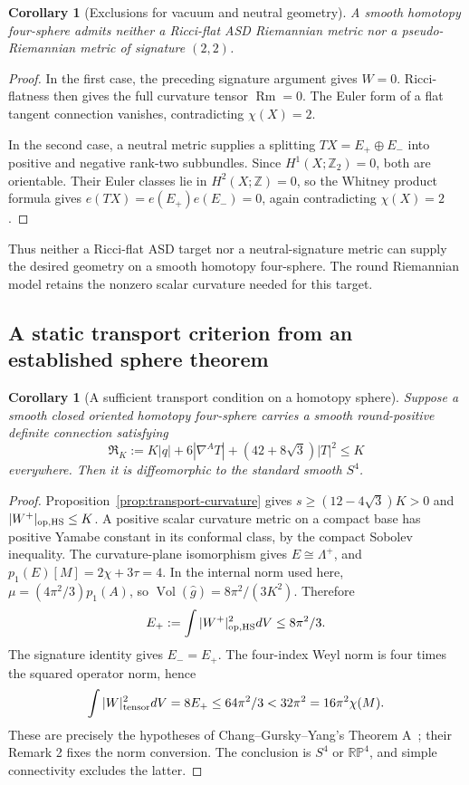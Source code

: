 \documentclass[11pt]{article}
\numberwithin{equation}{section}
\newtheorem{corollary}[theorem]{Corollary}
\theoremstyle{definition}
\theoremstyle{remark}
\DeclareMathOperator{\Vol}{Vol}
\begin{document}
\begin{corollary}[Exclusions for vacuum and neutral geometry]
\label{cor:ctx-wave-exclusions}
A smooth homotopy four-sphere admits neither a Ricci-flat ASD
Riemannian metric nor a pseudo-Riemannian metric of signature $(2,2)$.
\end{corollary}
\begin{proof}
In the first case, the preceding signature argument gives $W=0$.
Ricci-flatness then gives the full curvature tensor
$\operatorname{Rm}=0$.  The Euler form of a flat tangent connection
vanishes, contradicting $\chi(X)=2$.

In the second case, a neutral metric supplies a splitting
$TX=E_+\oplus E_-$ into positive and negative rank-two subbundles.
Since $H^1(X;\mathbb Z_2)=0$, both are orientable.  Their Euler
classes lie in $H^2(X;\mathbb Z)=0$, so the Whitney product formula
gives $e(TX)=e(E_+)e(E_-)=0$, again contradicting $\chi(X)=2$.
\end{proof}

Thus neither a Ricci-flat ASD target nor a neutral-signature metric can supply the desired geometry on a smooth homotopy four-sphere. The round Riemannian model retains the nonzero scalar curvature needed for this target.




\subsection{A static transport criterion from an established sphere theorem}
\label{subsec:static-sphere}

\begin{corollary}[A sufficient transport condition on a homotopy sphere]
\label{cor:static-transport-sphere}
Suppose a smooth closed oriented homotopy four-sphere carries a smooth
round-positive definite connection satisfying
\[
 \mathfrak R_K:=K|q|+6|\nabla^A T|+(42+8\sqrt3)|T|^2\leq K
\]
everywhere. Then it is diffeomorphic to the standard smooth $S^4$.
\end{corollary}
\begin{proof}
Proposition~\ref{prop:transport-curvature} gives
$s\geq(12-4\sqrt3)K>0$ and $|W^+|_{\rm op,HS}\leq K$.
A positive scalar curvature metric on a compact base has positive Yamabe
constant in its conformal class, by the compact Sobolev inequality.
The curvature-plane isomorphism gives $E\cong\Lambda^+$, and
$p_1(E)[M]=2\chi+3\tau=4$. In the internal norm used here,
$\mu=(4\pi^2/3)p_1(A)$, so
$\Vol(\widehat g)=8\pi^2/(3K^2)$. Therefore
\[
 E_+:=\int|W^+|_{\rm op,HS}^2dV\leq8\pi^2/3.
\]
The signature identity gives $E_-=E_+$. The four-index Weyl norm is
four times the squared operator norm, hence
\[
 \int|W|_{\rm tensor}^2dV=8E_+
       \leq64\pi^2/3<32\pi^2=16\pi^2\chi(M).
\]
These are precisely the hypotheses of Chang--Gursky--Yang's
Theorem A~\cite{ChangGurskyYang2003}; their Remark 2 fixes the norm
conversion. The conclusion is $S^4$ or $\mathbb{RP}^4$, and simple
connectivity excludes the latter.
\end{proof}
\end{document}
